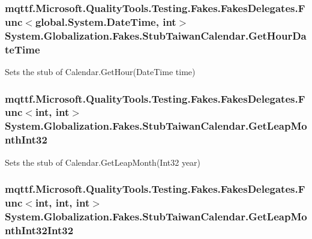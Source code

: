 \hypertarget{class_system_1_1_globalization_1_1_fakes_1_1_stub_taiwan_calendar_ab31a043db92f41809ea6f2808eb8154a}{
\subsubsection[{Get\-Hour\-Date\-Time}]{\setlength{\rightskip}{0pt plus 5cm}mqttf.\-Microsoft.\-Quality\-Tools.\-Testing.\-Fakes.\-Fakes\-Delegates.\-Func$<$global.\-System.\-Date\-Time, int$>$ System.\-Globalization.\-Fakes.\-Stub\-Taiwan\-Calendar.\-Get\-Hour\-Date\-Time}}\label{class_system_1_1_globalization_1_1_fakes_1_1_stub_taiwan_calendar_ab31a043db92f41809ea6f2808eb8154a}


Sets the stub of Calendar.\-Get\-Hour(\-Date\-Time time)

\hypertarget{class_system_1_1_globalization_1_1_fakes_1_1_stub_taiwan_calendar_ab73651bdb479c8df951ace386e1e6d74}{
\subsubsection[{Get\-Leap\-Month\-Int32}]{\setlength{\rightskip}{0pt plus 5cm}mqttf.\-Microsoft.\-Quality\-Tools.\-Testing.\-Fakes.\-Fakes\-Delegates.\-Func$<$int, int$>$ System.\-Globalization.\-Fakes.\-Stub\-Taiwan\-Calendar.\-Get\-Leap\-Month\-Int32}}\label{class_system_1_1_globalization_1_1_fakes_1_1_stub_taiwan_calendar_ab73651bdb479c8df951ace386e1e6d74}


Sets the stub of Calendar.\-Get\-Leap\-Month(\-Int32 year)

\hypertarget{class_system_1_1_globalization_1_1_fakes_1_1_stub_taiwan_calendar_ae664daa260eff8112159e9779c6f832e}{
\subsubsection[{Get\-Leap\-Month\-Int32\-Int32}]{\setlength{\rightskip}{0pt plus 5cm}mqttf.\-Microsoft.\-Quality\-Tools.\-Testing.\-Fakes.\-Fakes\-Delegates.\-Func$<$int, int, int$>$ System.\-Globalization.\-Fakes.\-Stub\-Taiwan\-Calendar.\-Get\-Leap\-Month\-Int32\-Int32}}\label{class_system_1_1_globalization_1_1_fakes_1_1_stub_taiwan_calendar_ae664daa260eff8112159e9779c6f832e}


